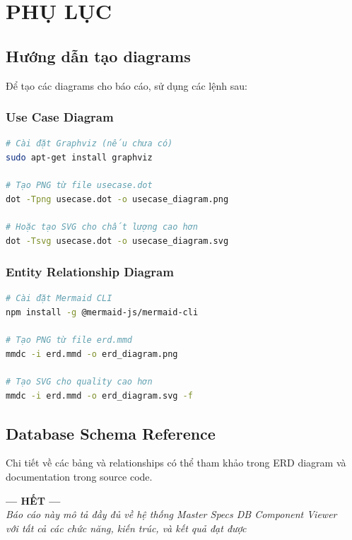 \documentclass[12pt,a4paper]{article}
\begin{document}
\vspace{1cm}

\section{PHỤ LỤC}

\subsection{Hướng dẫn tạo diagrams}
Để tạo các diagrams cho báo cáo, sử dụng các lệnh sau:

\subsubsection{Use Case Diagram}
\begin{lstlisting}[language=bash, caption=Tạo Use Case Diagram từ file DOT]
# Cài đặt Graphviz (nếu chưa có)
sudo apt-get install graphviz

# Tạo PNG từ file usecase.dot
dot -Tpng usecase.dot -o usecase_diagram.png

# Hoặc tạo SVG cho chất lượng cao hơn
dot -Tsvg usecase.dot -o usecase_diagram.svg
\end{lstlisting}

\subsubsection{Entity Relationship Diagram}
\begin{lstlisting}[language=bash, caption=Tạo ERD từ file Mermaid]
# Cài đặt Mermaid CLI
npm install -g @mermaid-js/mermaid-cli

# Tạo PNG từ file erd.mmd
mmdc -i erd.mmd -o erd_diagram.png

# Tạo SVG cho quality cao hơn
mmdc -i erd.mmd -o erd_diagram.svg -f
\end{lstlisting}

\subsection{Database Schema Reference}
Chi tiết về các bảng và relationships có thể tham khảo trong ERD diagram và documentation trong source code.

\vspace{2cm}

\begin{center}
\textbf{--- HẾT ---}\\[0.5cm]
\textit{Báo cáo này mô tả đầy đủ về hệ thống Master Specs DB Component Viewer}\\
\textit{với tất cả các chức năng, kiến trúc, và kết quả đạt được}
\end{center}
\end{document}
